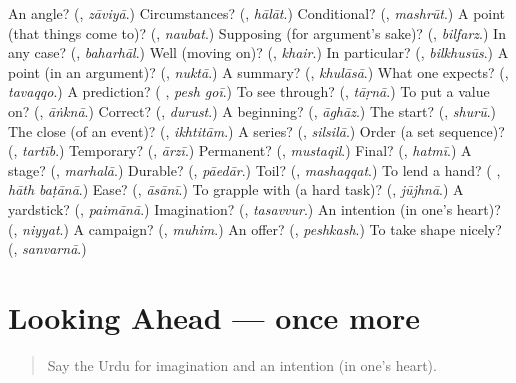 \begin{tcolorbox}[breakable,colback=teal!4,colframe=teal!35!black,title={Before you move on}]
An angle? (\textbf{}, \emph{zāviyā}.) Circumstances? (\textbf{}, \emph{hālāt}.) Conditional? (\textbf{}, \emph{mashrūt}.) A point (that things come to)? (\textbf{}, \emph{naubat}.) Supposing (for argument's sake)? (\textbf{}, \emph{bilfarz}.) In any case? (\textbf{}, \emph{baharhāl}.) Well (moving on)? (\textbf{}, \emph{khair}.) In particular? (\textbf{}, \emph{bilkhusūs}.) A point (in an argument)? (\textbf{}, \emph{nuktā}.) A summary? (\textbf{}, \emph{khulāsā}.) What one expects? (\textbf{}, \emph{tavaqqo}.) A prediction? (\textbf{ }, \emph{pesh goī}.) To see through? (\textbf{}, \emph{tāṛnā}.) To put a value on? (\textbf{}, \emph{āṅknā}.) Correct? (\textbf{}, \emph{durust}.) A beginning? (\textbf{}, \emph{āghāz}.) The start? (\textbf{}, \emph{shurū}.) The close (of an event)? (\textbf{}, \emph{ikhtitām}.) A series? (\textbf{}, \emph{silsilā}.) Order (a set sequence)? (\textbf{}, \emph{tartīb}.) Temporary? (\textbf{}, \emph{ārzī}.) Permanent? (\textbf{}, \emph{mustaqil}.) Final? (\textbf{}, \emph{hatmī}.) A stage? (\textbf{}, \emph{marhalā}.) Durable? (\textbf{}, \emph{pāedār}.) Toil? (\textbf{}, \emph{mashaqqat}.) To lend a hand? (\textbf{ }, \emph{hāth baṭānā}.) Ease? (\textbf{}, \emph{āsānī}.) To grapple with (a hard task)? (\textbf{}, \emph{jūjhnā}.) A yardstick? (\textbf{}, \emph{paimānā}.) Imagination? (\textbf{}, \emph{tasavvur}.) An intention (in one's heart)? (\textbf{}, \emph{niyyat}.) A campaign? (\textbf{}, \emph{muhim}.) An offer? (\textbf{}, \emph{peshkash}.) To take shape nicely? (\textbf{}, \emph{sanvarnā}.)
\end{tcolorbox}
\section[(dialogue)]{Looking Ahead — once more}

\label{lesson:UR-R547-review-final-547}



\begin{quote}
Say the Urdu for imagination and an intention (in one's heart).
\end{quote}

